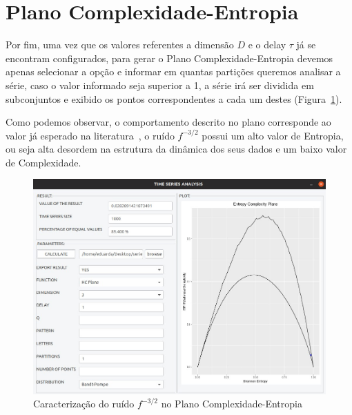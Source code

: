 \section{Plano Complexidade-Entropia}

Por fim, uma vez que os valores referentes a dimensão $D$ e o delay $\tau$ já se encontram configurados, para gerar o Plano Complexidade-Entropia devemos apenas selecionar a opção  e informar em quantas partições queremos analisar a série, caso o valor informado seja superior a 1, a série irá ser dividida em subconjuntos e exibido os pontos correspondentes a cada um destes (Figura~\ref{fig:hCPlane}).

Como podemos observar, o comportamento descrito no plano corresponde ao valor já esperado na literatura~\citep{phdthesis}, o ruído $f^{-3/2}$ possui um alto valor de Entropia, ou seja alta desordem na estrutura da dinâmica dos seus dados e um baixo valor de Complexidade.

\begin{figure}[!hbt]
	\centering
	\includegraphics[width=0.85\columnwidth]{capitulos/imagens/hCPlane} 
    \caption{Caracterização do ruído $f^{-3/2}$ no Plano Complexidade-Entropia}
    \label{fig:hCPlane}
\end{figure}